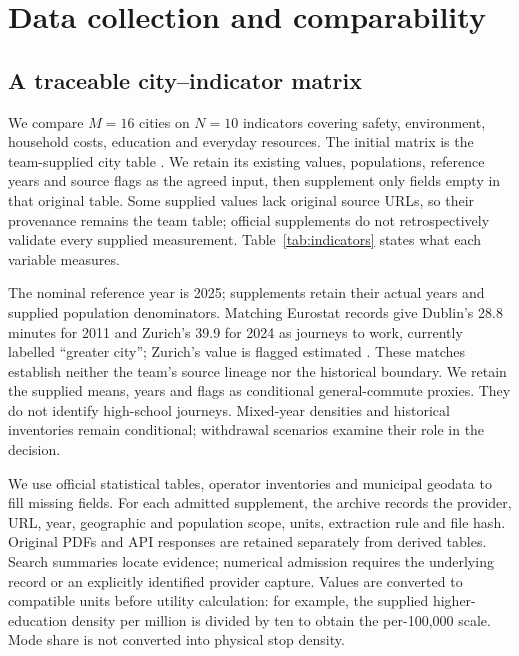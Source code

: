 \section{Data collection and comparability}
\subsection{A traceable city--indicator matrix}
We compare $M=16$ cities on $N=10$ indicators covering safety, environment,
household costs, education and everyday resources. The initial matrix is the
team-supplied city table \cite{teamtable}. We retain its existing values, populations, reference
years and source flags as the agreed input, then supplement only fields empty in that original table.
Some supplied values lack original source URLs, so their provenance remains
the team table; official supplements do not retrospectively validate every
supplied measurement. Table~\ref{tab:indicators} states what each variable measures.



The nominal reference year is 2025; supplements retain their actual years and
supplied population denominators. Matching Eurostat records give Dublin's
28.8 minutes for 2011 and Zurich's 39.9 for 2024 as journeys to work, currently
labelled ``greater city''; Zurich's value is flagged estimated \cite{eurostatcommute}.
These matches establish neither the team's source lineage nor the historical
boundary. We retain the supplied means, years and flags as conditional
general-commute proxies. They do not identify high-school journeys.
Mixed-year densities and historical inventories remain conditional;
withdrawal scenarios examine their role in the decision.

We use official statistical tables, operator inventories and municipal geodata
to fill missing fields. For each admitted supplement, the archive records the
provider, URL, year, geographic and population scope, units, extraction rule and
file hash. Original PDFs and API responses are retained separately from derived
tables. Search summaries locate evidence; numerical admission requires the
underlying record or an explicitly identified provider capture. Values are
converted to compatible units before utility calculation: for example, the
supplied higher-education density per million is divided by ten to obtain the
per-100,000 scale. Mode share is not converted into physical stop density.

